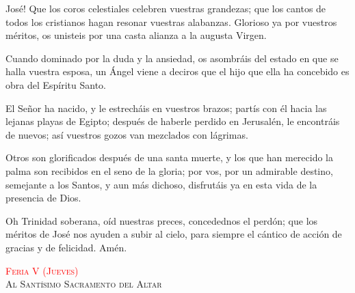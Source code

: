 \documentclass[10pt]{article}
\begin{document}
\begin{multicols}{2}
      \begin{otherlanguage}{latin}
            

            \vspace{1mm}

            

            \vspace{1mm}

            

      \end{otherlanguage}

      \vspace{2mm}

      José! Que los coros celestiales celebren vuestras grandezas; que los cantos de todos los cristianos hagan resonar vuestras alabanzas. Glorioso ya por vuestros méritos, os
      unisteis por una casta alianza a la augusta Virgen.

      Cuando dominado por la duda y la ansiedad, os asombráis del estado en que se halla vuestra esposa, un Ángel viene a deciros que el hijo que ella ha concebido es obra del Espíritu Santo.

      El Señor ha nacido, y le estrecháis en vuestros brazos; partís con él hacia las lejanas playas de Egipto; después de haberle perdido en Jerusalén, le encontráis de nuevos; así vuestros gozos
      van mezclados con lágrimas.

      Otros son glorificados después de una santa muerte, y los que han merecido la palma son recibidos en el seno de la gloria; por vos, por un admirable destino, semejante a los Santos, y aun
      más dichoso, disfrutáis ya en esta vida de la presencia de Dios.

      Oh Trinidad soberana, oíd nuestras preces, concedednos el perdón; que los méritos de José nos ayuden a subir al cielo, para siempre el cántico de acción de gracias y de felicidad. Amén.


      \begin{center}
            \textsc{\textcolor{red}{Feria V (Jueves)}\\ {\large Al Santísimo Sacramento del Altar}}
      \end{center}


\end{multicols}
\end{document}
